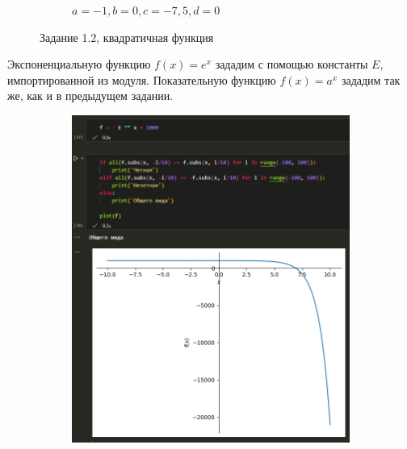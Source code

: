 \documentclass[14pt,a4paper]{extarticle}
\begin{document}
\begin{figure}[!ht]
\begin{subfigure}{.5\textwidth}
        \caption{$a=-1,b=0,c=-7,5,d=0$}
        \label{fig:1.2-cb2}
    \end{subfigure}
    \caption{Задание 1.2, квадратичная функция}
    \label{fig:1.2-cb}
\end{figure}

Экспоненциальную функцию $f(x)=e^x$ зададим с помощью константы $E$, импортированной из модуля.
Показательную функцию $f(x)=a ^ x$ зададим так же, как и в предыдущем задании.

\begin{figure}[!ht]
    \centering
    \begin{subfigure}{.5\textwidth}
        \centering
        \includegraphics[width=0.9\linewidth]{figures/1.2-exp.png}
    \end{subfigure}%
    \begin{subfigure}{.5\textwidth}
        \centering

\end{subfigure}
\end{figure}
\end{document}
